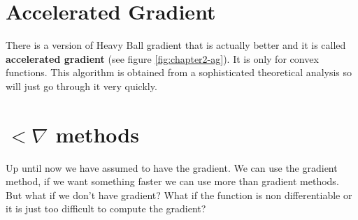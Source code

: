\section{Accelerated Gradient}
\par There is a version of Heavy Ball gradient that is actually better and it is called \textbf{accelerated gradient} (see figure \ref{fig:chapter2-ag}). It is only for convex functions. This algorithm is obtained from a sophisticated theoretical analysis so will just go through it very quickly.
%
%
%
\section{$< \nabla$ methods}
\par Up until now we have assumed to have the gradient. We can use the gradient method, if we want something faster we can use more than gradient methods. But what if we don't have gradient? What if the function is non differentiable or it is just too difficult to compute the gradient?
%
